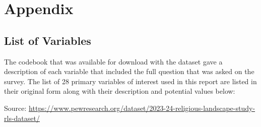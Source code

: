 \documentclass[
]{article}
\begin{document}
\section{Appendix}\label{appendix}

\subsection{List of Variables}\label{list-of-variables}

The codebook that was available for download with the dataset gave a
description of each variable that included the full question that was
asked on the survey. The list of 28 primary variables of interest used
in this report are listed in their original form along with their
description and potential values below:

Source:
\url{https://www.pewresearch.org/dataset/2023-24-religious-landscape-study-rls-dataset/}
\end{document}
